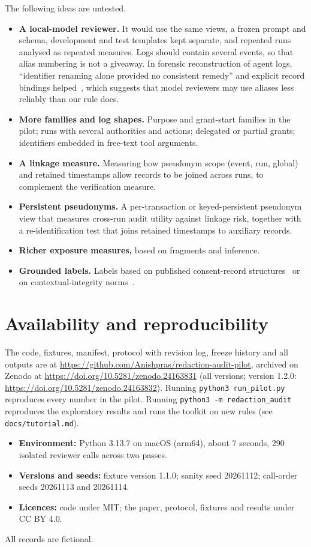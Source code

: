 \documentclass[11pt]{article}
\newcommand{\code}[1]{\texttt{#1}}
\begin{document}
The following ideas are untested.
\begin{itemize}
  \item \textbf{A local-model reviewer.} It would use the same views, a frozen prompt and schema, development and test templates kept separate, and repeated runs analysed as repeated measures. Logs should contain several events, so that alias numbering is not a giveaway. In forensic reconstruction of agent logs, ``identifier renaming alone provided no consistent remedy'' and explicit record bindings helped~\cite{yun2026evidence}, which suggests that model reviewers may use aliases less reliably than our rule does.
  \item \textbf{More families and log shapes.} Purpose and grant-start families in the pilot; runs with several authorities and actions; delegated or partial grants; identifiers embedded in free-text tool arguments.
  \item \textbf{A linkage measure.} Measuring how pseudonym scope (event, run, global) and retained timestamps allow records to be joined across runs, to complement the verification measure.
  \item \textbf{Persistent pseudonyms.} A per-transaction or keyed-persistent pseudonym view that measures cross-run audit utility against linkage risk, together with a re-identification test that joins retained timestamps to auxiliary records.
  \item \textbf{Richer exposure measures,} based on fragments and inference.
  \item \textbf{Grounded labels.} Labels based on published consent-record structures~\cite{iso27560} or on contextual-integrity norms~\cite{guo2026agentciscope}.
\end{itemize}

\section*{Availability and reproducibility}

The code, fixtures, manifest, protocol with revision log, freeze history and all outputs are at \url{https://github.com/Anishpras/redaction-audit-pilot}, archived on Zenodo at \url{https://doi.org/10.5281/zenodo.24163831} (all versions; version 1.2.0: \url{https://doi.org/10.5281/zenodo.24163832}). Running \code{python3 run\_pilot.py} reproduces every number in the pilot. Running \code{python3 -m redaction\_audit} reproduces the exploratory results and runs the toolkit on new rules (see \code{docs/tutorial.md}).
\begin{itemize}
  \item \textbf{Environment:} Python 3.13.7 on macOS (arm64), about 7 seconds, 290 isolated reviewer calls across two passes.
  \item \textbf{Versions and seeds:} fixture version 1.1.0; sanity seed 20261112; call-order seeds 20261113 and 20261114.
  \item \textbf{Licences:} code under MIT; the paper, protocol, fixtures and results under CC BY 4.0.
\end{itemize}
All records are fictional.
\end{document}
